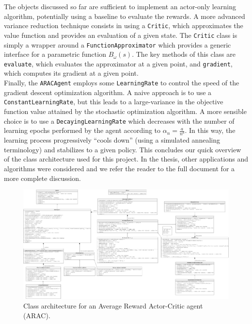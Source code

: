 The objects discussed so far are sufficient to implement an actor-only learning algorithm, potentially using a baseline to evaluate the rewards. A more advanced variance reduction technique consists in using a \lstinline{Critic}, which approximates the value function and provides an evaluation of a given state. The \lstinline{Critic} class is simply a wrapper around a \lstinline{FunctionApproximator} which provides a generic interface for a parametric function $B_\omega(s)$. The key methods of this class are \lstinline{evaluate}, which evaluates the approximator at a given point, and \lstinline{gradient}, which computes its gradient at a given point.\\
Finally, the \lstinline{ARACAgent} employs some \lstinline{LearningRate} to control the speed of the gradient descent optimization algorithm. A naive approach is to use a \lstinline{ConstantLearningRate}, but this leads to a large-variance in the objective function value attained by the stochastic optimization algorithm. A more sensible choice is to use a \lstinline{DecayingLearningRate} which decreases with the number of learning epochs performed by the agent according to $\alpha_n = \frac{a}{n^b}$. In this way, the learning process progressively ``cools down'' (using a simulated annealing terminology) and stabilizes to a given policy. This concludes our quick overview of the class architecture used for this project. In the thesis, other applications and algorithms were considered and we refer the reader to the full document for a more complete discussion.
\begin{figure}
    \includegraphics[width=\textwidth]{Images/A_agent}
    \caption[Class architecture for an ARAC agent]{Class architecture for an Average Reward Actor-Critic agent (ARAC).}
    \label{fig:class_architecture_arac}
\end{figure}
\clearpage

